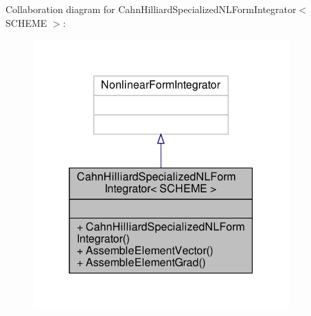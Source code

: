 Collaboration diagram for Cahn\+Hilliard\+Specialized\+N\+L\+Form\+Integrator$<$ S\+C\+H\+E\+ME $>$\+:\nopagebreak
\begin{figure}[H]
\begin{center}
\leavevmode
\includegraphics[width=280pt]{classCahnHilliardSpecializedNLFormIntegrator__coll__graph}
\end{center}
\end{figure}
